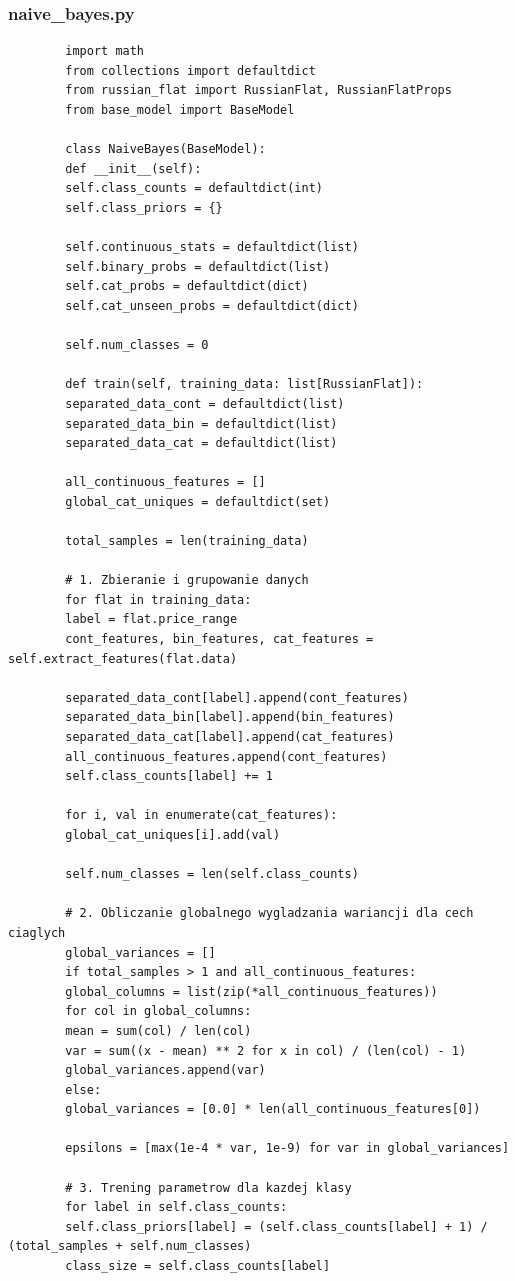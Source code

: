 \documentclass[12pt,a4paper]{article}
\begin{document}
	\subsubsection*{naive\_bayes.py}
	\begin{lstlisting}
		import math
		from collections import defaultdict
		from russian_flat import RussianFlat, RussianFlatProps
		from base_model import BaseModel
		
		class NaiveBayes(BaseModel):
		def __init__(self):
		self.class_counts = defaultdict(int)
		self.class_priors = {}
		
		self.continuous_stats = defaultdict(list)
		self.binary_probs = defaultdict(list)
		self.cat_probs = defaultdict(dict)
		self.cat_unseen_probs = defaultdict(dict)
		
		self.num_classes = 0
		
		def train(self, training_data: list[RussianFlat]):
		separated_data_cont = defaultdict(list)
		separated_data_bin = defaultdict(list)
		separated_data_cat = defaultdict(list)
		
		all_continuous_features = []
		global_cat_uniques = defaultdict(set)
		
		total_samples = len(training_data)
		
		# 1. Zbieranie i grupowanie danych
		for flat in training_data:
		label = flat.price_range
		cont_features, bin_features, cat_features = self.extract_features(flat.data)
		
		separated_data_cont[label].append(cont_features)
		separated_data_bin[label].append(bin_features)
		separated_data_cat[label].append(cat_features)
		all_continuous_features.append(cont_features)
		self.class_counts[label] += 1
		
		for i, val in enumerate(cat_features):
		global_cat_uniques[i].add(val)
		
		self.num_classes = len(self.class_counts)
		
		# 2. Obliczanie globalnego wygladzania wariancji dla cech ciaglych
		global_variances = []
		if total_samples > 1 and all_continuous_features:
		global_columns = list(zip(*all_continuous_features))
		for col in global_columns:
		mean = sum(col) / len(col)
		var = sum((x - mean) ** 2 for x in col) / (len(col) - 1)
		global_variances.append(var)
		else:
		global_variances = [0.0] * len(all_continuous_features[0])
		
		epsilons = [max(1e-4 * var, 1e-9) for var in global_variances]
		
		# 3. Trening parametrow dla kazdej klasy
		for label in self.class_counts:
		self.class_priors[label] = (self.class_counts[label] + 1) / (total_samples + self.num_classes)
		class_size = self.class_counts[label]
		

\end{lstlisting}
\end{document}
